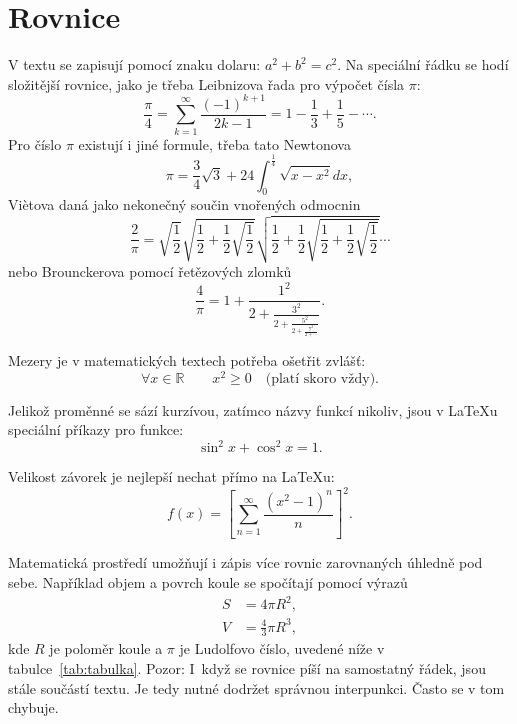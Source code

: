 \documentclass{article}
\begin{document}
	\section{Rovnice}
	V textu se zapisují pomocí znaku dolaru: $a^2+b^2=c^2$.
	Na speciální řádku se hodí složitější rovnice, jako je třeba Leibnizova řada pro výpočet čísla $\pi$:
	\begin{equation}
		\frac{\pi}{4}=\sum_{k=1}^{\infty}\frac{(-1)^{k+1}}{2k-1}
			=1-\frac{1}{3}+\frac{1}{5}-\dotsb.
	\end{equation}
	Pro číslo $\pi$ existují i jiné formule, třeba tato Newtonova
	\begin{equation}
		\pi=\frac{3}{4}\sqrt{3}+24\int_{0}^{\frac{1}{4}}\sqrt{x-x^2}dx,
	\end{equation}
	Vi\`etova daná jako nekonečný součin vnořených odmocnin
	\begin{equation}
		\frac{2}{\pi}=\sqrt{\frac{1}{2}}\sqrt{\frac{1}{2}+\frac{1}{2}\sqrt{\frac{1}{2}}}\sqrt{\frac{1}{2}+\frac{1}{2}\sqrt{\frac{1}{2}+\frac{1}{2}\sqrt{\frac{1}{2}}}}\dotsb
	\end{equation}
	nebo Brounckerova pomocí řetězových zlomků~\cite{Beckmann1998}
	\begin{equation}
		\label{eq:Brouncker}
		\frac{4}{\pi}=1+\frac{1^2}{2+\frac{3^2}{2+\frac{5^2}{2+\frac{7^2}{2+\dotsb}}}}.
	\end{equation}
	
	Mezery je v matematických textech potřeba ošetřit zvlášť:
	\begin{equation}
		\forall x\in\mathbb{R}\qquad x^{2}\geq0 \quad\textrm{(platí skoro vždy)}.
	\end{equation}
	
	Jelikož proměnné se sází kurzívou, zatímco názvy funkcí nikoliv,
	jsou v \LaTeX u speciální příkazy pro funkce:
	\begin{equation}
		\sin^{2}x+\cos^2{x}=1.
	\end{equation}
	
	Velikost závorek je nejlepší nechat přímo na \LaTeX u:
	\begin{equation}
		f(x)=\left[\sum_{n=1}^{\infty}\frac{\left(x^2-1\right)^n}{n}\right]^2.
	\end{equation}
	
	Matematická prostředí umožňují i zápis více rovnic zarovnaných úhledně pod sebe.
	Například objem a povrch koule se spočítají pomocí výrazů
	\begin{align}
		S&=4\pi R^{2},\\
		V&=\frac{4}{3}\pi R^{3},
	\end{align}
	kde $R$ je poloměr koule a $\pi$ je Ludolfovo číslo, uvedené níže v tabulce~\ref{tab:tabulka}.
	Pozor: I~když se rovnice píší na samostatný řádek, jsou stále součástí textu.
	Je tedy nutné dodržet správnou interpunkci.
	Často se v tom chybuje.
	
\end{document}
